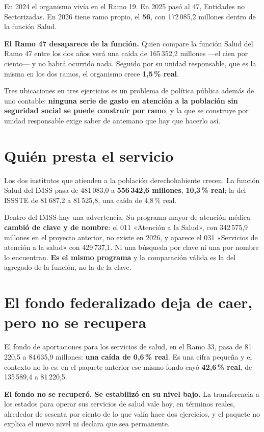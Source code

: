 En 2024 el organismo vivía en el Ramo 19. En 2025 pasó al 47, Entidades no Sectorizadas. En
2026 tiene ramo propio, el \textbf{56}, con 172\,085,2 millones dentro de la función Salud.

\textbf{El Ramo 47 desaparece de la función.} Quien compare la función Salud del Ramo 47 entre
los dos años verá una caída de 165\,352,2 millones ---el cien por ciento--- y no habrá ocurrido
nada. Seguido por su unidad responsable, que es la misma en los dos ramos, el organismo crece
\textbf{1,5\,\% real}.

Tres ubicaciones en tres ejercicios es un problema de política pública además de uno contable:
\textbf{ninguna serie de gasto en atención a la población sin seguridad social se puede
construir por ramo}, y la que se construye por unidad responsable exige saber de antemano que
hay que hacerlo así.

\section{Quién presta el servicio}

Los dos institutos que atienden a la población derechohabiente crecen. La función Salud del
IMSS pasa de 481\,083,0 a \textbf{556\,342,6 millones}, \textbf{10,3\,\% real}; la del ISSSTE
de 81\,687,2 a 81\,525,8, una caída de 4,8\,\% real.

Dentro del IMSS hay una advertencia. Su programa mayor de atención médica \textbf{cambió de
clave y de nombre}: el 011 «Atención a la Salud», con 342\,575,9 millones en el proyecto
anterior, no existe en 2026, y aparece el 031 «Servicios de atención a la salud» con
429\,737,1. Ni una búsqueda por clave ni una por nombre lo encuentran. \textbf{Es el mismo
programa} y la comparación válida es la del agregado de la función, no la de la clave.

\section{El fondo federalizado deja de caer, pero no se recupera}

El fondo de aportaciones para los servicios de salud, en el Ramo 33, pasa de 81\,220,5 a
84\,635,9 millones: \textbf{una caída de 0,6\,\% real}. Es una cifra pequeña y el contexto no
lo es: en el paquete anterior ese mismo fondo cayó \textbf{42,6\,\% real}, de 135\,589,4 a
81\,220,5.

\textbf{El fondo no se recuperó. Se estabilizó en su nivel bajo.} La transferencia a los
estados para operar sus servicios de salud vale hoy, en términos reales, alrededor de sesenta
por ciento de lo que valía hace dos ejercicios, y el paquete no explica el nuevo nivel ni
declara que sea permanente.

